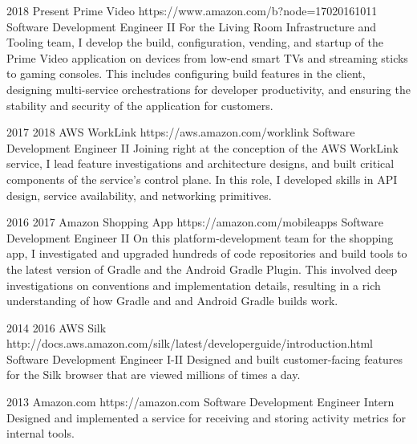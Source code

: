 \job
{2018} {Present}
{Prime Video} {https://www.amazon.com/b?node=17020161011}
{Software Development Engineer II}
{
    For the Living Room Infrastructure and Tooling team, I develop the build, configuration, vending, and startup of the Prime Video application on devices from low-end smart TVs and streaming sticks to gaming consoles. This includes configuring build features in the client, designing multi-service orchestrations for developer productivity, and ensuring the stability and security of the application for customers.
}

\job
{2017} {2018}
{AWS WorkLink} {https://aws.amazon.com/worklink}
{Software Development Engineer II}
{
    Joining right at the conception of the AWS WorkLink service, I lead feature investigations and architecture designs, and built critical components of the service's control plane. In this role, I developed skills in API design, service availability, and networking primitives.
}

\job
{2016} {2017}
{Amazon Shopping App} {https://amazon.com/mobileapps}
{Software Development Engineer II}
{
    On this platform-development team for the shopping app, I investigated and upgraded hundreds of code repositories and build tools to the latest version of  {Gradle} and the  {Android Gradle Plugin}. This involved deep investigations on conventions and implementation details, resulting in a rich understanding of how Gradle and and Android Gradle builds work.
}

\job
{2014} {2016}
{AWS Silk} {http://docs.aws.amazon.com/silk/latest/developerguide/introduction.html}
{Software Development Engineer I-II}
{
    Designed and built customer-facing features for the Silk browser that are viewed millions of times a day.
}

\job
{2013} {}
{Amazon.com} {https://amazon.com}
{Software Development Engineer Intern}
{
    Designed and implemented a service for receiving and storing activity metrics for internal tools.
}